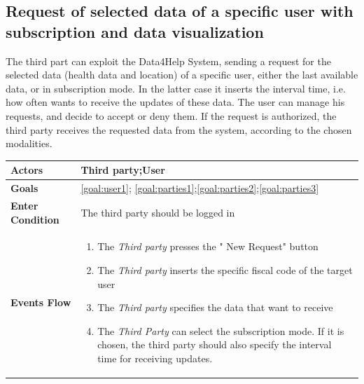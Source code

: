  \subsection{Request of selected data of a specific user with subscription and data visualization}
 
The third part can exploit the Data4Help System, sending a request for the selected data (health data and location) of a specific user, either the last available data, or in subscription mode.  
 In the latter case  it inserts the interval time, i.e. how often wants to receive the updates of these data.
The user can manage his requests, and decide to accept or deny them. If the request is authorized, the third party receives the requested data from the system, according to the chosen modalities.

\begin{table}[H]
	\centering
    
    \begin{tabular}{|p{3.5cm}|p{10.3cm}|}
    
    \hline
    \textbf{\large{Actors}}  			& \tabitem Third party;\tabitem  User  									\\
    				 			
    \hline
    \textbf{\large{Goals}} 				&\ref{goal:user1}; \ref{goal:parties1};\ref{goal:parties2};\ref{goal:parties3}\\
    
    \hline
    \textbf{\large{Enter Condition}} & The third party should be logged in	\\
    
    \hline
    \textbf{\large{Events Flow}}		& \begin{enumerate}[leftmargin=0.5cm]
                                          	\item The \emph{Third party}  presses the " New Request" button
                                            \item The \emph{Third party} inserts the specific fiscal code of the target user
                                            \item The \emph{Third party} specifies the data that want to receive
                                            
                                            \item The \emph{Third Party} can select the subscription mode. If 
                            it is chosen, the third party should also specify the interval time for receiving updates. 
                            

\end{enumerate}
\end{tabular}
\end{table}
